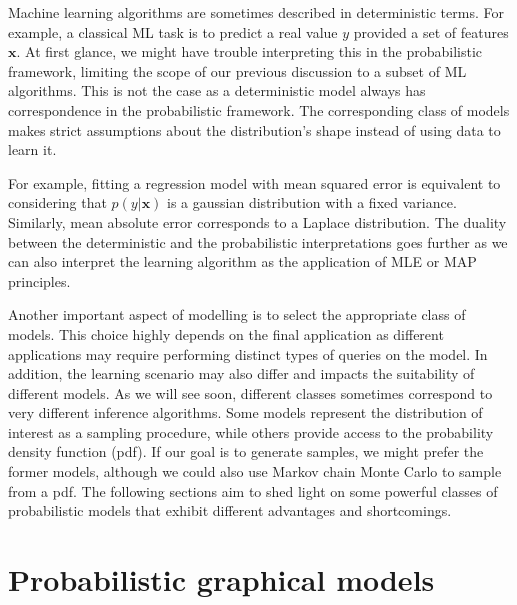Machine learning algorithms are sometimes described in deterministic terms. For example, a classical ML task is to predict a real value $y$ provided a set of features $\bm x$. At first glance, we might have trouble interpreting this in the probabilistic framework, limiting the scope of our previous discussion to a subset of ML algorithms. This is not the case as a deterministic model always has correspondence in the probabilistic framework. The corresponding class of models makes strict assumptions about the distribution's shape instead of using data to learn it.

For example, fitting a regression model with mean squared error is equivalent to considering that $p(y|\bm x)$ is a gaussian distribution with a fixed variance. Similarly, mean absolute error corresponds to a Laplace distribution. The duality between the deterministic and the probabilistic interpretations goes further as we can also interpret the learning algorithm as the application of MLE or MAP principles. %

Another important aspect of modelling is to select the appropriate class of models. This choice highly depends on the final application as different applications may require performing distinct types of queries on the model. In addition, the learning scenario may also differ and impacts the suitability of different models. As we will see soon, different classes sometimes correspond to very different inference algorithms. Some models represent the distribution of interest as a sampling procedure, while others provide access to the probability density function (pdf). If our goal is to generate samples, we might prefer the former models, although we could also use Markov chain Monte Carlo to sample from a pdf. The following sections aim to shed light on some powerful classes of probabilistic models that exhibit different advantages and shortcomings.

%

\section{Probabilistic graphical models}

